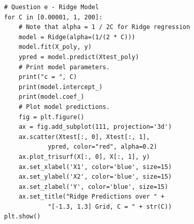 \documentclass[10pt]{article}
\begin{document}
\begin{lstlisting}
# Question e - Ridge Model
for C in [0.00001, 1, 200]:
    # Note that alpha = 1 / 2C for Ridge regression
    model = Ridge(alpha=(1/(2 * C)))
    model.fit(X_poly, y)
    ypred = model.predict(Xtest_poly)
    # Print model parameters.
    print("c = ", C)
    print(model.intercept_)
    print(model.coef_)
    # Plot model predictions.
    fig = plt.figure()
    ax = fig.add_subplot(111, projection='3d')
    ax.scatter(Xtest[:, 0], Xtest[:, 1],
            ypred, color="red", alpha=0.2)
    ax.plot_trisurf(X[:, 0], X[:, 1], y)
    ax.set_xlabel('X1', color='blue', size=15)
    ax.set_ylabel('X2', color='blue', size=15)
    ax.set_zlabel('Y', color='blue', size=15)
    ax.set_title("Ridge Predictions over " +
            "[-1.3, 1.3] Grid, C = " + str(C))
plt.show()
\end{lstlisting}
\end{document}
